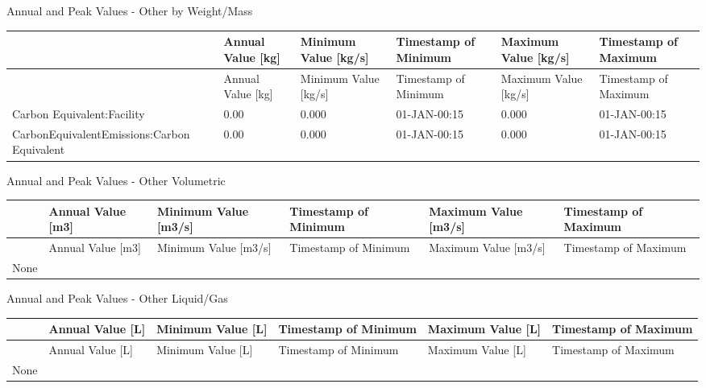 Annual and Peak Values - Other by Weight/Mass

{\scriptsize
\begin{longtable}[c]{>{\raggedright}p{1.0in}>{\raggedright}p{1.0in}>{\raggedright}p{1.0in}>{\raggedright}p{1.0in}>{\raggedright}p{1.0in}>{\raggedright}p{1.0in}}
  \toprule 
  & Annual Value [kg] & Minimum Value [kg/s] & Timestamp of Minimum & Maximum Value [kg/s] & Timestamp of Maximum \tabularnewline
  \midrule
  \endfirsthead

  \toprule 
  & Annual Value [kg] & Minimum Value [kg/s] & Timestamp of Minimum & Maximum Value [kg/s] & Timestamp of Maximum \tabularnewline
  \midrule
  \endhead

  Carbon Equivalent\-:Facility & 0.00 & 0.000 & 01-JAN-00\-:15 & 0.000 & 01-JAN-00\-:15 \tabularnewline
  Carbon\-Equivalent\-Emissions\-:Carbon Equivalent & 0.00 & 0.000 & 01-JAN-00\-:15 & 0.000 & 01-JAN-00\-:15 \tabularnewline
  \bottomrule
\end{longtable}}

Annual and Peak Values - Other Volumetric

\begin{longtable}[c]{>{\raggedright}p{1.0in}>{\raggedright}p{1.0in}>{\raggedright}p{1.0in}>{\raggedright}p{1.0in}>{\raggedright}p{1.0in}>{\raggedright}p{1.0in}}
\toprule 
 & Annual Value [m3] & Minimum Value [m3/s] & Timestamp of Minimum & Maximum Value [m3/s] & Timestamp of Maximum \tabularnewline
\midrule
\endfirsthead

\toprule 
 & Annual Value [m3] & Minimum Value [m3/s] & Timestamp of Minimum & Maximum Value [m3/s] & Timestamp of Maximum \tabularnewline
\midrule
\endhead

None & ~ & ~ & ~ & ~ & ~ \tabularnewline
\bottomrule
\end{longtable}

Annual and Peak Values - Other Liquid/Gas

\begin{longtable}[c]{>{\raggedright}p{1.0in}>{\raggedright}p{1.0in}>{\raggedright}p{1.0in}>{\raggedright}p{1.0in}>{\raggedright}p{1.0in}>{\raggedright}p{1.0in}}
\toprule 
 & Annual Value [L] & Minimum Value [L] & Timestamp of Minimum & Maximum Value [L] & Timestamp of Maximum \tabularnewline
\midrule
\endfirsthead

\toprule 
 & Annual Value [L] & Minimum Value [L] & Timestamp of Minimum & Maximum Value [L] & Timestamp of Maximum \tabularnewline
\midrule
\endhead

None & ~ & ~ & ~ & ~ & ~ \tabularnewline
\bottomrule
\end{longtable}

